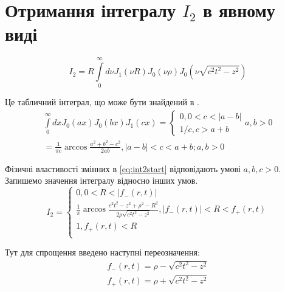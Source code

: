 \section{Отримання інтегралу $ I_2 $ в явному виді} \label{sec:i2anal}
%
\begin{equation} \label{eq:int2start}
I_2 = R \int \limits_{0}^{\infty} d \nu J_1 \left( \nu R \right) 
J_0 \left( \nu \rho \right) J_0 \left( \nu \sqrt{c^2t^2 - z^2} \right)
\end{equation}

Це табличний інтеграл, що може бути знайдений в 
\cite[ст. 228]{imp:SpecFunc1983}.
%
\begin{equation} \begin{aligned} \label{eq:intJ0J0J1tabel}
\int \limits_{0}^{\infty} d x J_0 \left( ax \right) 
J_0 \left( bx \right) J_1 \left( cx \right) = \begin{cases}
0, 0 < c < | a - b | \\ 
1/c, c > a + b
\end{cases} a, b > 0 \\
= \frac{1}{\pi c} \arccos \frac{a^2 + b^2 - c^2}{2ab},
| a - b | < c < a + b; a,b > 0
\end{aligned} \end{equation}

Фізичні властивості змінних в \eqref{eq:int2start} відповідають умові 
$ a,b,c > 0 $. Запишемо значення інтегралу відносно інших умов.
%
\begin{equation}
I_2 = \begin{cases}
0, 0 < R < | f_{-} \left( r, t \right) | \\
\frac{1}{\pi} \arccos \frac{c^2t^2 - z^2 + \rho^2 - R^2}
{2 \rho \sqrt{c^2t^2 - z^2}}, | f_{-} \left( r, t \right) | < R < 
f_{+} \left( r, t \right) \\ 1, f_{+} \left( r, t \right) < R \\
\end{cases}
\end{equation}

Тут для спрощення введено наступні переозначення:
%
\begin{equation*} \begin{aligned}
f_{-} \left( r, t \right) = \rho - \sqrt{c^2t^2 - z^2} \\
f_{+} \left( r, t \right) = \rho + \sqrt{c^2t^2 - z^2}
\end{aligned} \end{equation*}

